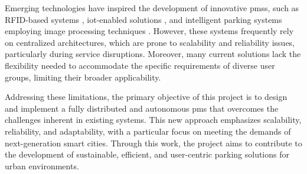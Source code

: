 Emerging technologies have inspired the development of innovative \glspl{pms}, such as RFID-based systems \autocite{rfid_smart_parking_management_system}, \gls{iot}-enabled solutions \autocite{development_smart_parking_management_system}, and intelligent parking systems employing image processing techniques \autocite{intelligent_parking_system_image_processing}. However, these systems frequently rely on centralized architectures, which are prone to scalability and reliability issues, particularly during service disruptions. Moreover, many current solutions lack the flexibility needed to accommodate the specific requirements of diverse user groups, limiting their broader applicability.

Addressing these limitations, the primary objective of this project is to design and implement a fully distributed and autonomous \gls{pms} that overcomes the challenges inherent in existing systems. This new approach emphasizes scalability, reliability, and adaptability, with a particular focus on meeting the demands of next-generation smart cities. Through this work, the project aims to contribute to the development of sustainable, efficient, and user-centric parking solutions for urban environments.


